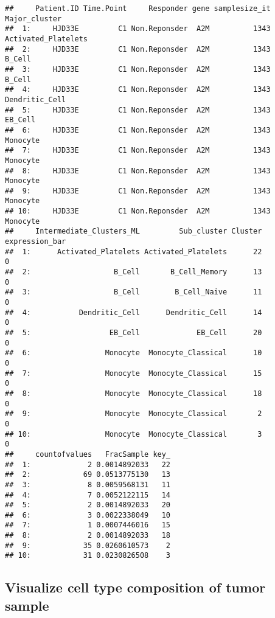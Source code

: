 \documentclass[
]{article}
\begin{document}
\begin{verbatim}
##     Patient.ID Time.Point     Responder gene samplesize_it       Major_cluster
##  1:     HJD33E         C1 Non.Reponsder  A2M          1343 Activated_Platelets
##  2:     HJD33E         C1 Non.Reponsder  A2M          1343              B_Cell
##  3:     HJD33E         C1 Non.Reponsder  A2M          1343              B_Cell
##  4:     HJD33E         C1 Non.Reponsder  A2M          1343      Dendritic_Cell
##  5:     HJD33E         C1 Non.Reponsder  A2M          1343             EB_Cell
##  6:     HJD33E         C1 Non.Reponsder  A2M          1343            Monocyte
##  7:     HJD33E         C1 Non.Reponsder  A2M          1343            Monocyte
##  8:     HJD33E         C1 Non.Reponsder  A2M          1343            Monocyte
##  9:     HJD33E         C1 Non.Reponsder  A2M          1343            Monocyte
## 10:     HJD33E         C1 Non.Reponsder  A2M          1343            Monocyte
##     Intermediate_Clusters_ML         Sub_cluster Cluster expression_bar
##  1:      Activated_Platelets Activated_Platelets      22              0
##  2:                   B_Cell       B_Cell_Memory      13              0
##  3:                   B_Cell        B_Cell_Naive      11              0
##  4:           Dendritic_Cell      Dendritic_Cell      14              0
##  5:                  EB_Cell             EB_Cell      20              0
##  6:                 Monocyte  Monocyte_Classical      10              0
##  7:                 Monocyte  Monocyte_Classical      15              0
##  8:                 Monocyte  Monocyte_Classical      18              0
##  9:                 Monocyte  Monocyte_Classical       2              0
## 10:                 Monocyte  Monocyte_Classical       3              0
##     countofvalues   FracSample key_
##  1:             2 0.0014892033   22
##  2:            69 0.0513775130   13
##  3:             8 0.0059568131   11
##  4:             7 0.0052122115   14
##  5:             2 0.0014892033   20
##  6:             3 0.0022338049   10
##  7:             1 0.0007446016   15
##  8:             2 0.0014892033   18
##  9:            35 0.0260610573    2
## 10:            31 0.0230826508    3
\end{verbatim}

\hypertarget{visualize-cell-type-composition-of-tumor-sample}{%
\subsection{Visualize cell type composition of tumor
sample}\label{visualize-cell-type-composition-of-tumor-sample}}
\end{document}
